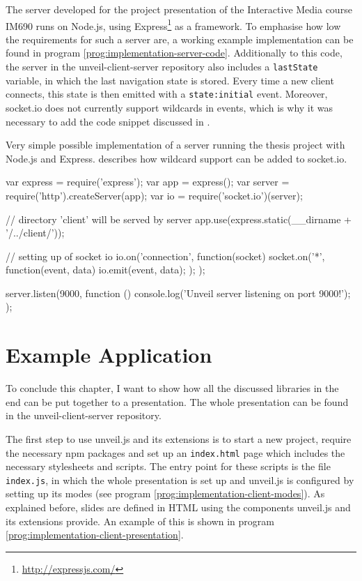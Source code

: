 The server developed for the project presentation of the Interactive Media course IM690 runs on Node.js, using Express\footnote{\url{http://expressjs.com/}} as a framework. To emphasise how low the requirements for such a server are, a working example implementation can be found in program \ref{prog:implementation-server-code}. Additionally to this code, the server in the unveil-client-server repository also includes a \texttt{lastState} variable, in which the last navigation state is stored. Every time a new client connects, this state is then emitted with a \texttt{state:initial} event. Moreover, socket.io does not currently support wildcards in events, which is why it was necessary to add the code snippet discussed in \cite{socket-io-wildcards}.

\begin{program}
\caption{Very simple possible implementation of a server running the thesis project with Node.js and Express. \cite{socket-io-wildcards} describes how wildcard support can be added to socket.io.}
\label{prog:implementation-server-code}
\begin{JsCode}
var express = require('express');
var app = express();
var server = require('http').createServer(app);
var io = require('socket.io')(server);

// directory 'client' will be served by server
app.use(express.static(__dirname + '/../client/'));

// setting up of socket io
io.on('connection', function(socket) {
  socket.on('*', function(event, data) {
    io.emit(event, data);
  });
});

server.listen(9000, function () {
  console.log('Unveil server listening on port 9000!');
});
\end{JsCode}
\end{program}

\section{Example Application}
\label{sec:implementation-client}

To conclude this chapter, I want to show how all the discussed libraries in the end can be put together to a presentation. The whole presentation can be found in the unveil-client-server repository.

The first step to use unveil.js and its extensions is to start a new project, require the necessary npm packages and set up an \texttt{index.html} page which includes the necessary stylesheets and scripts.
The entry point for these scripts is the file \texttt{index.js}, in which the whole presentation is set up and unveil.js is configured by setting up its modes (see program \ref{prog:implementation-client-modes}). As explained before, slides are defined in HTML using the components unveil.js and its extensions provide. An example of this is shown in program \ref{prog:implementation-client-presentation}.

